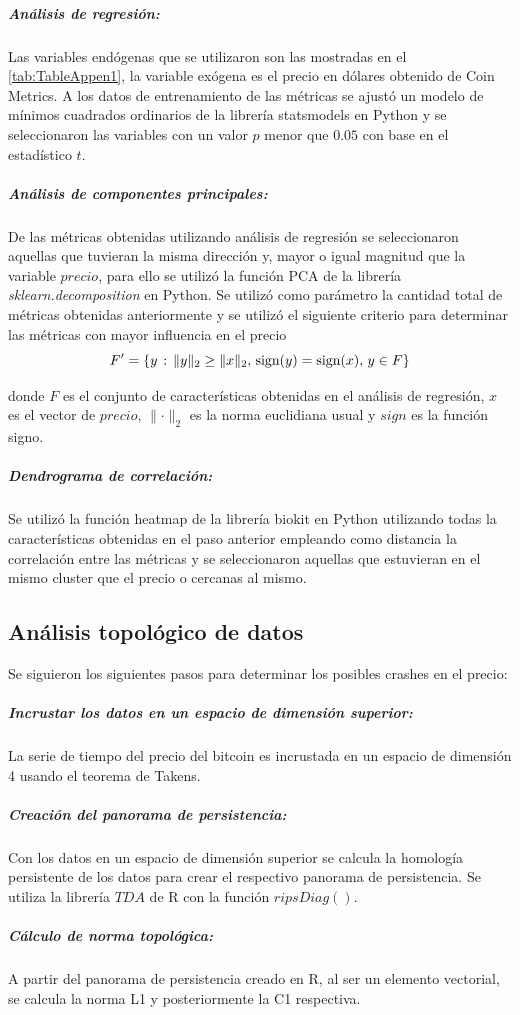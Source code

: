 \subparagraph{Análisis de regresión:}
\label{AR}
Las variables endógenas que se utilizaron son las mostradas en el \autoref{tab:TableAppen1}, la variable exógena es el precio en dólares obtenido de Coin Metrics. 
A los datos de entrenamiento de las métricas se ajustó un modelo de mínimos cuadrados ordinarios de la librería statsmodels en Python y se seleccionaron las variables con un valor $p$ menor que $0.05$ con base en el estadístico $t$.


\subparagraph{Análisis de componentes principales:}
\label{PCA}

De las métricas obtenidas utilizando análisis de regresión se seleccionaron aquellas que tuvieran la misma dirección y, mayor o igual magnitud que la variable $precio$, para ello se utilizó la función PCA de la librería \emph{sklearn.decomposition} en Python.
Se utilizó como parámetro la cantidad total de métricas obtenidas anteriormente y se utilizó el siguiente criterio para determinar las métricas con mayor influencia en el precio
\[ F^{\prime} = \{ y \hspace{0.5mm}:\hspace{0.5mm} \lVert y \rVert_2 \geq \lVert x \rVert_2,\hspace{0.5mm} \textrm{sign}(y) = \textrm{sign}(x),\hspace{0.5mm}y \in F\} \]

donde $F$ es el conjunto de características obtenidas en el análisis de regresión, $x$ es el vector de $precio$, $\lVert \cdot \rVert_2$ es la norma euclidiana usual y $sign$ es la función signo.

\subparagraph{Dendrograma de correlación:}
Se utilizó la función heatmap de la librería biokit en Python utilizando todas la características obtenidas en el paso anterior empleando como distancia la correlación entre las métricas y se seleccionaron aquellas que estuvieran en el mismo cluster que el precio o cercanas al mismo.

\subsection{Análisis topológico de datos}
Se siguieron los siguientes pasos para determinar los posibles crashes en el precio:

\subparagraph{Incrustar los datos en un espacio de dimensión superior:} La serie de tiempo del precio del bitcoin es incrustada en un espacio de dimensión 4 usando el teorema de Takens.
\subparagraph{Creación del panorama de persistencia:} Con los datos en un espacio de dimensión superior se calcula la homología persistente de los datos para crear el respectivo panorama de persistencia. Se utiliza la librería $TDA$ de R con la función $ripsDiag()$.
\subparagraph{Cálculo de norma topológica:} A partir del panorama de persistencia creado en R, al ser un elemento vectorial, se calcula la norma L1 y posteriormente la C1 respectiva.

